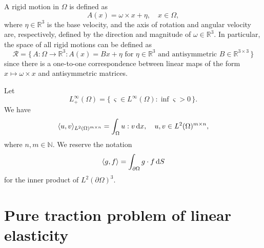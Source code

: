 \documentclass[reqno]{amsart}
\numberwithin{equation}{section}
\numberwithin{figure}{section}
\numberwithin{table}{section}
\newcommand{\inner}[1]{\langle#1\rangle}
\newcommand{\R}{\mathbb{R}}
\newcommand{\N}{\mathbb{N}}
\theoremstyle{definition}
\theoremstyle{plain}
\theoremstyle{definition}
\theoremstyle{remark}
\numberwithin{equation}{section}
\begin{document}
A rigid motion in $\Omega$ is defined as
%
\begin{equation*}
	A(x) = \omega \times x + \eta, \quad x \in \Omega,
\end{equation*}
%
where $\eta \in \R^3$ is the base velocity, and the axis of rotation and angular velocity are, respectively, defined by the direction and magnitude of $\omega \in \R^3$. In particular, the space of all rigid motions can be defined as
%
\begin{equation} \label{eq_def_R}
	\mathcal{R} = \{\, A\colon \Omega \to \R^3  :   A(x) = B x + \eta \text{ for } \eta \in \R^3 \text{ and antisymmetric } B \in \R^{3 \times 3} \,\}
\end{equation}
%
since there is a one-to-one correspondence between linear maps of the form $x \mapsto \omega \times x$ and antisymmetric matrices.

Let
%	
\begin{equation*}
	L^\infty_+(\Omega) = \{\, \varsigma \in L^\infty(\Omega) : \inf \varsigma > 0 \,\}.
\end{equation*}
%
We have
%
\begin{equation*}
	\inner{u,v}_{L^2(\Omega)^{m \times n}} = \int_\Omega u : v\, {\rm d} x, \quad u,v \in L^2(\Omega)^{m \times n},
\end{equation*}
%
where $n,m \in \N$. We reserve the notation
%
\begin{equation*}
	\inner{g, f} = \int_{\partial \Omega} g \cdot f \, {\rm d} S 
\end{equation*}
%
for the inner product of $L^2(\partial \Omega)^3$.

\section{Pure traction problem of linear elasticity} \label{sec_direct}
\end{document}
